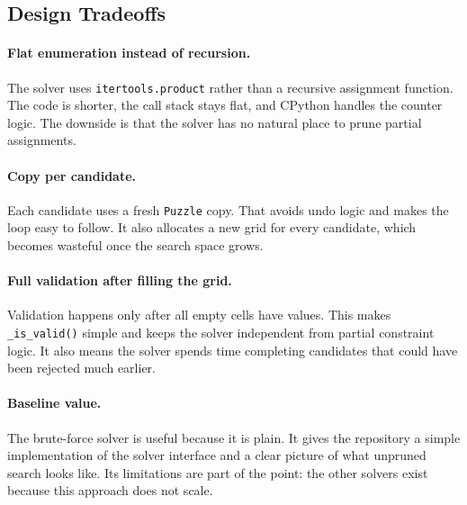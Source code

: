 \subsection{Design Tradeoffs}

\paragraph{Flat enumeration instead of recursion.}
The solver uses \texttt{itertools.product} rather than a recursive assignment
function. The code is shorter, the call stack stays flat, and CPython handles
the counter logic. The downside is that the solver has no natural place to
prune partial assignments.

\paragraph{Copy per candidate.}
Each candidate uses a fresh \texttt{Puzzle} copy. That avoids undo logic and
makes the loop easy to follow. It also allocates a new grid for every candidate,
which becomes wasteful once the search space grows.

\paragraph{Full validation after filling the grid.}
Validation happens only after all empty cells have values. This makes
\texttt{\_is\_valid()} simple and keeps the solver independent from partial
constraint logic. It also means the solver spends time completing candidates
that could have been rejected much earlier.

\paragraph{Baseline value.}
The brute-force solver is useful because it is plain. It gives the repository a
simple implementation of the solver interface and a clear picture of what
unpruned search looks like. Its limitations are part of the point: the other
solvers exist because this approach does not scale.
